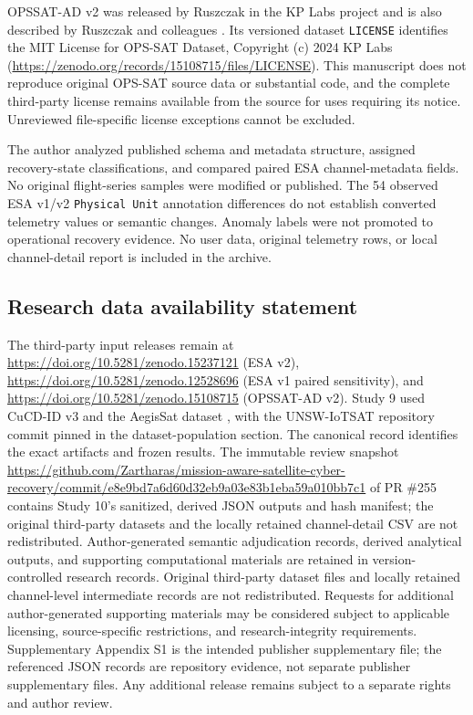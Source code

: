 \documentclass[preprint,12pt]{elsarticle}
\begin{document}
OPSSAT-AD v2 was released by Ruszczak in the KP Labs project and is also described by Ruszczak and colleagues \cite{ruszczak2025opssatbenchmark}. Its versioned dataset \texttt{LICENSE} identifies the MIT License for OPS-SAT Dataset, Copyright (c) 2024 KP Labs (\url{https://zenodo.org/records/15108715/files/LICENSE}). This manuscript does not reproduce original OPS-SAT source data or substantial code, and the complete third-party license remains available from the source for uses requiring its notice. Unreviewed file-specific license exceptions cannot be excluded.

The author analyzed published schema and metadata structure, assigned recovery-state classifications, and compared paired ESA channel-metadata fields. No original flight-series samples were modified or published. The 54 observed ESA v1/v2 \texttt{Physical Unit} annotation differences do not establish converted telemetry values or semantic changes. Anomaly labels were not promoted to operational recovery evidence. No user data, original telemetry rows, or local channel-detail report is included in the archive.

\subsection{Research data availability statement}
The third-party input releases remain at \url{https://doi.org/10.5281/zenodo.15237121} (ESA v2), \url{https://doi.org/10.5281/zenodo.12528696} (ESA v1 paired sensitivity), and \url{https://doi.org/10.5281/zenodo.15108715} (OPSSAT-AD v2). Study 9 used CuCD-ID v3 \cite{fayyaz2026cucddata} and the AegisSat dataset \cite{elovici2025aegissatdata}, with the UNSW-IoTSAT repository commit pinned in the dataset-population section. The canonical record identifies the exact artifacts and frozen results. The immutable review snapshot \url{https://github.com/Zartharas/mission-aware-satellite-cyber-recovery/commit/e8e9bd7a6d60d32eb9a03e83b1eba59a010bb7c1} of PR \#255 contains Study 10's sanitized, derived JSON outputs and hash manifest; the original third-party datasets and the locally retained channel-detail CSV are not redistributed. Author-generated semantic adjudication records, derived analytical outputs, and supporting computational materials are retained in version-controlled research records. Original third-party dataset files and locally retained channel-level intermediate records are not redistributed. Requests for additional author-generated supporting materials may be considered subject to applicable licensing, source-specific restrictions, and research-integrity requirements. Supplementary Appendix S1 is the intended publisher supplementary file; the referenced JSON records are repository evidence, not separate publisher supplementary files. Any additional release remains subject to a separate rights and author review.
\end{document}
